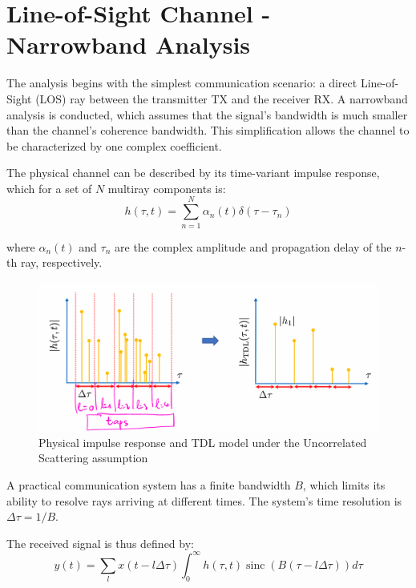 \chapter{Line-of-Sight Channel - Narrowband Analysis}
\label{chap:los}

The analysis begins with the simplest communication scenario: a direct Line-of-Sight (LOS) ray between the transmitter TX and the receiver RX. A narrowband analysis is conducted, which assumes that the signal's bandwidth is much smaller than the channel's coherence bandwidth. This simplification allows the channel to be characterized by one complex coefficient.

The physical channel can be described by its time-variant impulse response, which for a set of $N$ multiray components is:
\begin{equation}
	h(\tau,t) = \sum_{n=1}^{N} \alpha_n(t) \delta(\tau - \tau_n)
\end{equation}

where $\alpha_n(t)$ and $\tau_n$ are the complex amplitude and propagation delay of the $n$-th ray, respectively.

\begin{figure}[H]
	\centering
	\includegraphics[width=\linewidth]{content/4-images/taps}
	\caption{Physical impulse response and TDL model under the Uncorrelated Scattering assumption}
	\label{fig:taps}
\end{figure}

A practical communication system has a finite bandwidth $B$, which limits its ability to resolve rays arriving at different times. The system's time resolution is $\Delta\tau = 1/B$. 

The received signal is thus defined by:
\begin{equation}
	y(t) = \sum_l x(t-l \Delta \tau) \int_0^{\infty} h(\tau, t) \operatorname{sinc}(B(\tau-l \Delta \tau)) d \tau
\end{equation}

